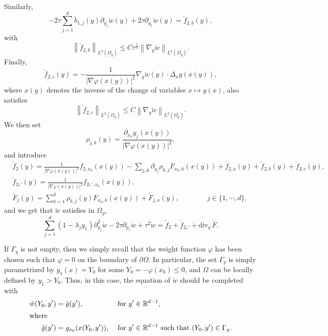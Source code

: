 \documentclass[10pt]{amsart}
\theoremstyle{definition}\newtheorem{defi}[theo]{Definition}\newtheorem{rema}[theo]{Remark}\newtheorem{exam}[theo]{Example}\newtheorem{exem}[theo]{Example}\newtheorem{nota}[theo]{Notation}
\newcommand*\R{\mathbb{R}}
\renewcommand{\leq}{\leqslant}
\begin{document}
Similarly,
\[
-2 \tau \sum_{j = 1}^d \check b_{1,j}(y) \partial_{y_j} \check w(y) + 2 \tau \partial_{y_1} \check w(y) =
\check f_{2,b}(y),
\]
with
\begin{equation*}
\left\| \check f_{2,b} \right\|_{L^2(\Omega_y)} \leq C \tau^{\frac{1}{3}} \left\| \nabla_y \check w\right\|_{L^2(\Omega_y)}.
\end{equation*}
Finally,
\[
\check f_{2,c} (y) = -\frac{1}{|\nabla \varphi(x(y))|^2} \nabla_y \check w(y) \cdot \Delta_x y(x(y)),
\]
where $x(y)$ denotes the inverse of the change of variables $x \mapsto y(x)$, also satisfies
\begin{equation*}
\left\| \check f_{2,c} \right\|_{L^2(\Omega_y)} \leq C \left\| \nabla_y \check w\right\|_{L^2(\Omega_y)}.
\end{equation*}
We then set
\[
\rho_{j,k}(y) = \frac{\partial_{x_k} y_j(x(y))}{|\nabla \varphi(x(y))|^2},
\]
and introduce
\begin{align*}
&
\check f_{2}(y) = \frac{1}{|\nabla \varphi(x(y))|^2} f_{2,x_0}(x(y)) - \sum_{j,k} \partial_{y_j} \rho_{k,j} F_{x_0,k}(x(y)) + \check f_{2,a}(y) + \check f_{2,b}(y) + \check f_{2,c} (y),
\\
&\check f_{2_*'}(y) = \frac{1}{|\nabla \varphi(x(y))|^2} f_{2_*',x_0}(x(y)),
\\
& \check F_j (y) = \sum_{k = 1}^d \rho_{k,j}(y) F_{x_0,k}(x(y))+ \check F_{j,a}(y), \qquad \qquad j \in \{1, \cdots, d\},
\end{align*}
and we get that $\check w$ satisfies in $\Omega_y$,
\[
\sum_{j = 1}^d (1 - \lambda_j y_1) \partial_{y_j}^2 \check w - 2 \tau \partial_{y_1} \check w +
\tau^2 \check w =
\check f_{2} +
\check f_{2_*'} +
\text{div}_y\, \check F.
\]

If $\Gamma_y$ is not empty, then we simply recall that the weight function $\varphi$ has been chosen such that $\varphi = 0$ on the boundary of $\partial \Omega$. In particular, the set $\Gamma_y$ is simply parametrized by $ y_1(x) = Y_0$ for some $Y_0 = - \varphi(x_0) \leq 0$, and $\Omega$ can be locally defined by $y_1 > Y_{0}$. Thus, in this case, the equation of $\check w$ should be completed with
\begin{align*}
\check w(Y_{0}, y') &= \check g(y'),  &&\text{ for } y' \in \R^{d-1},
\\
\intertext{where}
\check g(y') &= g_{x_0}(x(Y_0, y')),  &&\text{ for } y' \in \R^{d-1} \text{ such that } (Y_0, y') \in \Gamma_y.
\end{align*}
\end{document}
